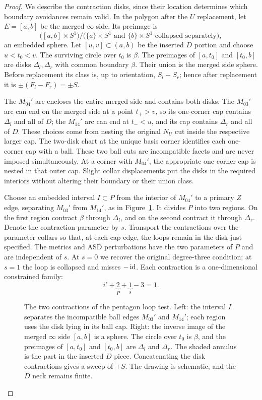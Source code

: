 \begin{proof}
We describe the contraction disks, since their location determines
which boundary avoidances remain valid.  In the polygon after the
$U$ replacement, let $E=[a,b]$ be the merged $\infty$ side.  Its
preimage is
\[
 \bigl([a,b]\times S^1\bigr)
  /\bigl(\{a\}\times S^1\text{ and }\{b\}\times S^1
       \text{ collapsed separately}\bigr),
\]
an embedded sphere.  Let $[u,v]\subset(a,b)$ be the inserted $D$
portion and choose $u<t_0<v$.  The surviving circle over $t_0$
is $\beta$.  The preimages of
$[a,t_0]$ and $[t_0,b]$ are disks $\Delta_l,\Delta_r$ with common
boundary $\beta$.  Their union is the merged side sphere.  Before
replacement its class is, up to orientation, $S_l-S_r$; hence after
replacement it is $\pm(F_l-F_r)=\pm S$.

The $M_{04}'$ arc encloses the entire merged side and contains both
disks.  The $M_{03}'$ arc can end on the merged side at a point
$t_+>v$, so its one-corner cap contains $\Delta_l$ and all of $D$;
the $M_{14}'$ arc can end at $t_-<u$, and its cap contains
$\Delta_r$ and all of $D$.  These choices come from nesting the
original $N_U$ cut inside the respective larger cap.  The two-disk
chart at the unique basis corner identifies each one-corner cap
with a ball.  These two ball cuts are incompatible facets and are
never imposed simultaneously.  At a corner with $M_{04}'$, the
appropriate one-corner cap is nested in that outer cap.  Slight
collar displacements put the disks in the required interiors without
altering their boundary or their union class.

Choose an embedded interval $I\subset P$ from the interior of
$M_{04}'$ to a primary $Z$ edge, separating $M_{03}'$ from
$M_{14}'$, as in Figure~\ref{fig:negative:contraction}.
It divides $P$ into two regions.  On the first region
contract $\beta$ through $\Delta_l$, and on the second contract it
through $\Delta_r$.  Denote the contraction parameter by $s$.
Transport the contractions over the parameter collars so that, at
each cap edge, the loops remain in the disk just specified.  The
metrics and ASD perturbations have the two parameters of $P$ and
are independent of $s$.  At $s=0$ we recover the original
degree-three condition; at $s=1$ the loop is collapsed and misses
$-\operatorname{id}$.  Each contraction is a one-dimensional constrained family:
\[
 i'+\underbrace{2}_{P}+\underbrace{1}_{s}-3=1.
\]

\begin{figure}[htbp]
\centering

\caption{The two contractions of the pentagon loop test.
Left: the interval $I$ separates the incompatible ball edges
$M_{03}'$ and $M_{14}'$; each region uses the disk lying in its ball cap.
Right: the inverse image of the merged $\infty$ side $[a,b]$ is a
sphere.  The circle over $t_0$ is $\beta$, and the preimages of
$[a,t_0]$ and $[t_0,b]$ are $\Delta_l$ and $\Delta_r$.
The shaded annulus is the part in the inserted $D$ piece.
Concatenating the disk contractions gives a sweep of $\pm S$.
The drawing is schematic, and the $D$ neck remains finite.}
\label{fig:negative:contraction}
\end{figure}


\end{proof}
